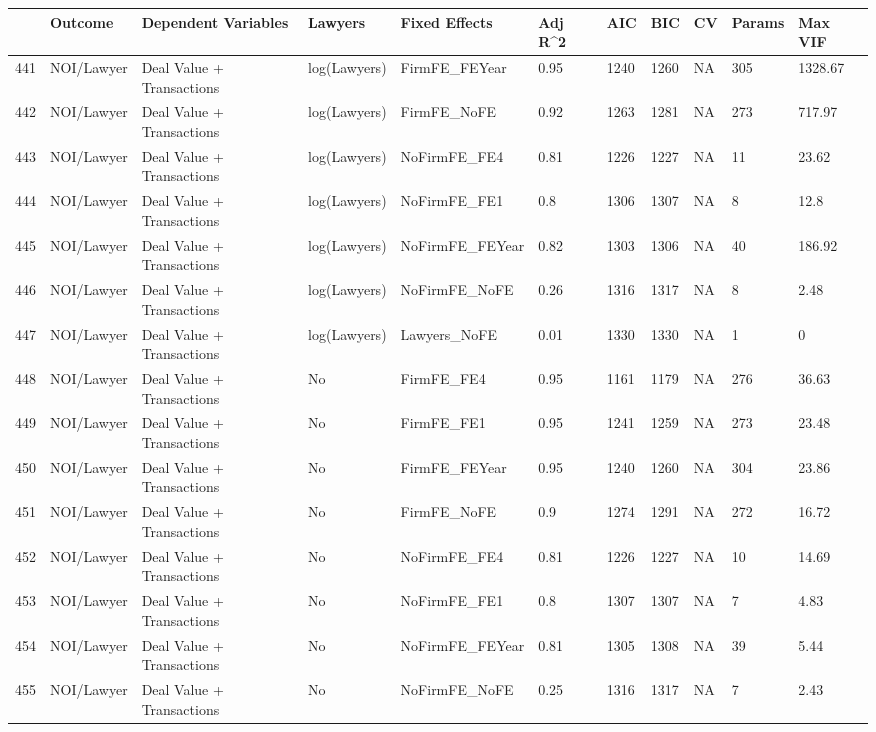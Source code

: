 \documentclass{article}
\begin{document}
\begin{table}[H]
\centering
\begin{tabular}{rllllllllll}
  \hline
 & Outcome & Dependent Variables & Lawyers & Fixed Effects & Adj R^2 & AIC & BIC & CV & Params & Max VIF \\ 
  \hline
441 & NOI/Lawyer & Deal Value + Transactions & log(Lawyers) & FirmFE\_FEYear & 0.95 & 1240 & 1260 & NA & 305 & 1328.67 \\ 
  442 & NOI/Lawyer & Deal Value + Transactions & log(Lawyers) & FirmFE\_NoFE & 0.92 & 1263 & 1281 & NA & 273 & 717.97 \\ 
  443 & NOI/Lawyer & Deal Value + Transactions & log(Lawyers) & NoFirmFE\_FE4 & 0.81 & 1226 & 1227 & NA & 11 & 23.62 \\ 
  444 & NOI/Lawyer & Deal Value + Transactions & log(Lawyers) & NoFirmFE\_FE1 & 0.8 & 1306 & 1307 & NA & 8 & 12.8 \\ 
  445 & NOI/Lawyer & Deal Value + Transactions & log(Lawyers) & NoFirmFE\_FEYear & 0.82 & 1303 & 1306 & NA & 40 & 186.92 \\ 
  446 & NOI/Lawyer & Deal Value + Transactions & log(Lawyers) & NoFirmFE\_NoFE & 0.26 & 1316 & 1317 & NA & 8 & 2.48 \\ 
  447 & NOI/Lawyer & Deal Value + Transactions & log(Lawyers) & Lawyers\_NoFE & 0.01 & 1330 & 1330 & NA & 1 & 0 \\ 
  448 & NOI/Lawyer & Deal Value + Transactions & No & FirmFE\_FE4 & 0.95 & 1161 & 1179 & NA & 276 & 36.63 \\ 
  449 & NOI/Lawyer & Deal Value + Transactions & No & FirmFE\_FE1 & 0.95 & 1241 & 1259 & NA & 273 & 23.48 \\ 
  450 & NOI/Lawyer & Deal Value + Transactions & No & FirmFE\_FEYear & 0.95 & 1240 & 1260 & NA & 304 & 23.86 \\ 
  451 & NOI/Lawyer & Deal Value + Transactions & No & FirmFE\_NoFE & 0.9 & 1274 & 1291 & NA & 272 & 16.72 \\ 
  452 & NOI/Lawyer & Deal Value + Transactions & No & NoFirmFE\_FE4 & 0.81 & 1226 & 1227 & NA & 10 & 14.69 \\ 
  453 & NOI/Lawyer & Deal Value + Transactions & No & NoFirmFE\_FE1 & 0.8 & 1307 & 1307 & NA & 7 & 4.83 \\ 
  454 & NOI/Lawyer & Deal Value + Transactions & No & NoFirmFE\_FEYear & 0.81 & 1305 & 1308 & NA & 39 & 5.44 \\ 
  455 & NOI/Lawyer & Deal Value + Transactions & No & NoFirmFE\_NoFE & 0.25 & 1316 & 1317 & NA & 7 & 2.43 \\ 

\end{tabular}
\end{table}
\end{document}
